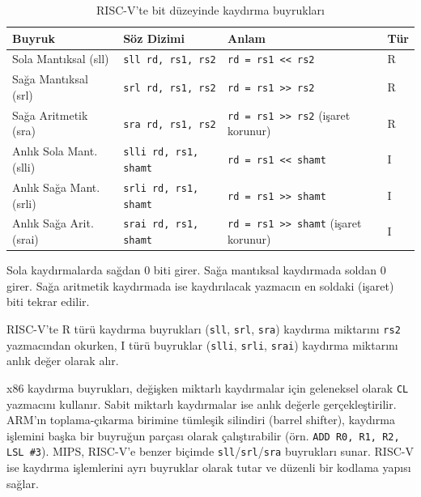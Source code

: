 \begin{table}[H]
\centering
\caption{RISC-V'te bit düzeyinde kaydırma buyrukları}
\label{tab:kaydirma-buyruklar}
\begin{tabular}{llll}
\toprule
\textbf{Buyruk} & \textbf{Söz Dizimi} & \textbf{Anlam} & \textbf{Tür} \\
\midrule
Sola Mantıksal (sll)      & \texttt{sll rd, rs1, rs2}    & \texttt{rd = rs1 << rs2}  & R \\
Sağa Mantıksal (srl)      & \texttt{srl rd, rs1, rs2}    & \texttt{rd = rs1 >> rs2}  & R \\
Sağa Aritmetik (sra)      & \texttt{sra rd, rs1, rs2}    & \texttt{rd = rs1 >> rs2} (işaret korunur) & R \\
Anlık Sola Mant. (slli)   & \texttt{slli rd, rs1, shamt} & \texttt{rd = rs1 << shamt} & I \\
Anlık Sağa Mant. (srli)   & \texttt{srli rd, rs1, shamt} & \texttt{rd = rs1 >> shamt} & I \\
Anlık Sağa Arit. (srai)   & \texttt{srai rd, rs1, shamt} & \texttt{rd = rs1 >> shamt} (işaret korunur) & I \\
\bottomrule
\end{tabular}
\end{table}

Sola kaydırmalarda sağdan 0 biti girer. Sağa mantıksal kaydırmada soldan 0 girer. Sağa aritmetik kaydırmada ise kaydırılacak yazmacın en soldaki (işaret) biti tekrar edilir.

RISC-V'te R türü kaydırma buyrukları (\texttt{sll}, \texttt{srl}, \texttt{sra}) kaydırma miktarını \texttt{rs2} yazmacından okurken, I türü buyruklar (\texttt{slli}, \texttt{srli}, \texttt{srai}) kaydırma miktarını anlık değer olarak alır.


\begin{karsilastirma}
x86 kaydırma buyrukları, değişken miktarlı kaydırmalar için geleneksel olarak \texttt{CL} yazmacını kullanır. Sabit miktarlı kaydırmalar ise anlık değerle gerçekleştirilir. ARM'ın toplama-çıkarma birimine tümleşik silindiri (barrel shifter), kaydırma işlemini başka bir buyruğun parçası olarak çalıştırabilir (örn. \texttt{ADD R0, R1, R2, LSL \#3}). MIPS, RISC-V'e benzer biçimde \texttt{sll}/\texttt{srl}/\texttt{sra} buyrukları sunar. RISC-V ise kaydırma işlemlerini ayrı buyruklar olarak tutar ve düzenli bir kodlama yapısı sağlar.
\end{karsilastirma}

